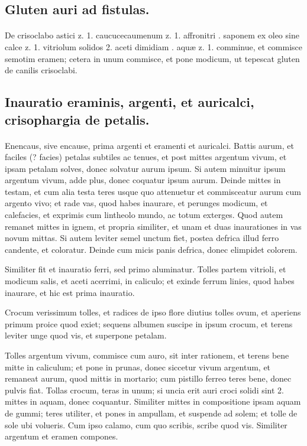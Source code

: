 \documentclass[a4paper, 11pt, oneside, polutonikogreek, italian]{article}
\begin{document}
\subsection{Gluten auri ad fistulas.}
\paragraph{}
De crisoclabo astici z. 1. caucucecaumenum z. 1. affronitri \roundz. saponem ex oleo sine calce z. 1. vitriolum solidos 2. aceti dimidiam \roundz. aquæ z. 1. comminue, et commisce semotim eramen; cetera in unum commisce, et pone modicum, ut tepescat gluten de canilis crisoclabi.

\subsection{Inauratio eraminis, argenti, et auricalci, crisophargia de petalis.}
\paragraph{}
Enencaus, sive encause, prima argenti et eramenti et auricalci. Battis aurum, et faciles (? facies) petalas subtiles ac tenues, et post mittes argentum vivum, et ipsam petalam solves, donec solvatur aurum ipsum. Si autem minuitur ipsum argentum vivum, adde plus, donec coquatur ipsum aurum. Deinde mittes in testam, et cum alia testa teres usque quo attenuetur et commisceatur aurum cum argento vivo; et rade vas, quod habes inaurare, et perunges modicum, et calefacies, et exprimis cum lintheolo mundo, ac totum exterges. Quod autem remanet mittes in ignem, et propria similiter, et unam et duas inaurationes in vas novum mittas. Si autem leviter semel unctum fiet, postea defrica illud ferro candente, et coloratur. Deinde cum micis panis defrica, donec elimpidet colorem.

Similiter fit et inauratio ferri, sed primo aluminatur. Tolles partem vitrioli, et modicum salis, et aceti acerrimi, in caliculo; et exinde ferrum linies, quod habes inaurare, et hic est prima inauratio.

Crocum verissimum tolles, et radices de ipso flore diutius tolles ovum, et aperiens primum proice quod exiet; sequens albumen suscipe in ipsum crocum, et terens leviter unge quod vis, et superpone petalam.

Tolles argentum vivum, commisce cum auro, sit inter rationem, et terens bene mitte in caliculum; et pone in prunas, donec siccetur vivum argentum, et remaneat aurum, quod mittis in mortario; cum pistillo ferreo teres bene, donec pulvis fiat. Tollas crocum, teras in unum; si uncia erit auri croci solidi sint 2. mittes in aquam, donec coquantur. Similiter mittes in compositione ipsam aquam de gummi; teres utiliter, et pones in ampullam, et suspende ad solem; et tolle de sole ubi volueris. Cum ipso calamo, cum quo scribis, scribe quod vis. Similiter argentum et eramen compones.
\end{document}
